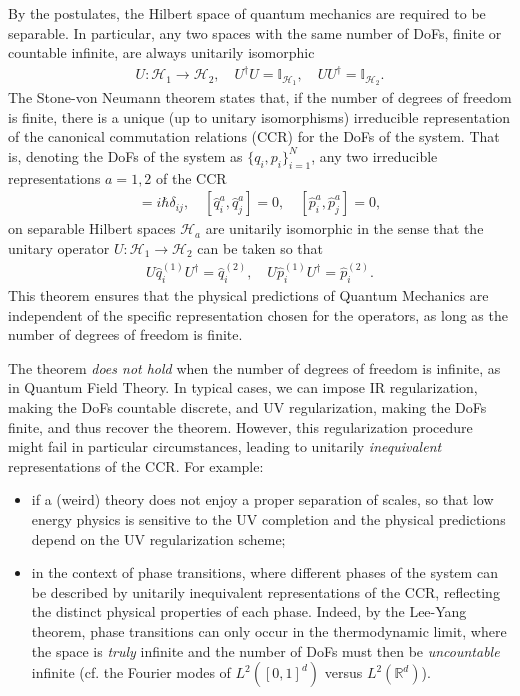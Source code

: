 \documentclass[../QFT_main.tex]{subfiles}
\begin{document}
\begin{mytheorem}
%
By the postulates, the Hilbert space of quantum mechanics are required to be separable.
In particular, any two spaces with the same number of DoFs, finite or countable infinite, are always unitarily isomorphic
{\small\begin{align}
    U:\mathcal{H}_1 \to \mathcal{H}_2, \quad U^\dagger U = \mathbb{I}_{\mathcal{H}_1}, \quad U U^\dagger = \mathbb{I}_{\mathcal{H}_2}.
\end{align}}  
The Stone-von Neumann theorem states that, if the number of degrees of freedom is finite, there is a unique (up to unitary isomorphisms) irreducible representation of the canonical commutation relations (CCR) for the DoFs of the system.
That is, denoting the DoFs of the system as $\{q_i, p_i\}_{i=1}^N$, any two irreducible representations $a=1,2$ of the CCR 
{\small\begin{align}
    [\hat{q}^a_i, \hat{p}^a_j] = i\hbar \delta_{ij}, \quad [\hat{q}^a_i, \hat{q}^a_j] = 0, \quad [\hat{p}^a_i, \hat{p}^a_j] = 0,
\end{align}}
on separable Hilbert spaces $\mathcal{H}_a$ are unitarily isomorphic in the sense that the unitary operator \(U: \mathcal{H}_1 \to \mathcal{H}_2\) can be taken so that
{\small\begin{align}
    U \hat{q}^{(1)}_i U^\dagger = \hat{q}^{(2)}_i, \quad U \hat{p}^{(1)}_i U^\dagger = \hat{p}^{(2)}_i.
\end{align}}
This theorem ensures that the physical predictions of Quantum Mechanics are independent of the specific representation chosen for the operators, as long as the number of degrees of freedom is finite.

The theorem \emph{does not hold} when the number of degrees of freedom is infinite, as in Quantum Field Theory.
In typical cases, we can impose IR regularization, making the DoFs countable discrete, and UV regularization, making the DoFs finite, and thus recover the theorem.
However, this regularization procedure might fail in particular circumstances, leading to unitarily \emph{inequivalent} representations of the CCR.
For example:
\begin{itemize}
    \item if a (weird) theory does not enjoy a proper separation of scales, so that low energy physics is sensitive to the UV completion and the physical predictions depend on the UV regularization scheme;
    \item in the context of phase transitions, where different phases of the system can be described by unitarily inequivalent representations of the CCR, reflecting the distinct physical properties of each phase. Indeed, by the Lee-Yang theorem, phase transitions can only occur in the thermodynamic limit, where the space is \emph{truly} infinite and the number of DoFs must then be \emph{uncountable} infinite (cf. the Fourier modes of $L^2([0,1]^d)$ versus $L^2(\mathbb{R}^d)$).
\end{itemize}
%
\end{mytheorem}
\end{document}

